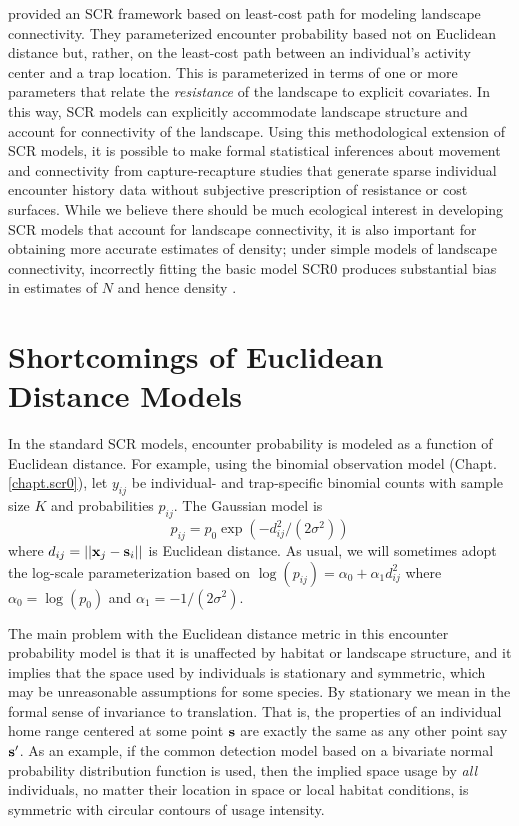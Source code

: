 \citet{royle_etal:2012ecol} provided an SCR
framework based on least-cost path for modeling landscape
connectivity. They parameterized encounter probability
based not on Euclidean distance but, rather,
on the least-cost path between an individual's activity center and a
trap location. This is parameterized in terms of one or more
parameters that relate the {\it resistance} of the landscape to
explicit covariates.  In this way, SCR models can explicitly accommodate
landscape structure and account for connectivity of the landscape.
Using this
methodological extension of SCR models, it is possible to make formal
statistical inferences about movement and connectivity from
capture-recapture studies that generate sparse individual encounter
history data without subjective prescription of resistance or cost
surfaces. %
While we believe there
should be much ecological interest in developing SCR models that
account for landscape connectivity, it is also important for obtaining
more accurate estimates of density; under simple models of landscape
connectivity, incorrectly fitting the basic model SCR0 produces
substantial bias in estimates of $N$ and hence density  \citep{royle_etal:2012ecol}.


\section{Shortcomings of Euclidean Distance Models}

In the standard SCR models, encounter probability is modeled as a
function of Euclidean distance. For example, using the binomial
observation model (Chapt. \ref{chapt.scr0}), let $y_{ij}$ be
individual- and trap-specific binomial counts with sample size $K$ and
probabilities $p_{ij}$. The Gaussian model is
\begin{equation}
p_{ij} = p_{0} \exp(-  d_{ij}^2 /(2\sigma^{2}) )
\label{ecoldist.eq.encounter}
\end{equation}
where $d_{ij} = ||{\bf x}_{j} - {\bf s}_{i}||$ is Euclidean
distance. As usual, we will sometimes adopt the log-scale
parameterization based on $\log(p_{ij})= \alpha_{0} + \alpha_{1}
d_{ij}^{2}$ where %
$\alpha_{0} = \log(p_{0})$ and $\alpha_{1} = -1/(2\sigma^2)$.

The main problem with the Euclidean distance metric in this encounter
probability model is that it is unaffected by habitat or landscape
structure, and it implies that the space used by individuals is
stationary and symmetric, which may be unreasonable assumptions for
some species. By stationary %
we mean in the formal sense of
invariance to translation. That is, the properties of an individual
home range centered at some point ${\bf s}$ are exactly the same as
any other point say ${\bf s}'$.  As an example, if the common
detection model based on a bivariate normal probability distribution
function is used, then the implied space usage by {\it all}
individuals, no matter their location in space or local habitat
conditions, is symmetric with circular contours of usage intensity.

